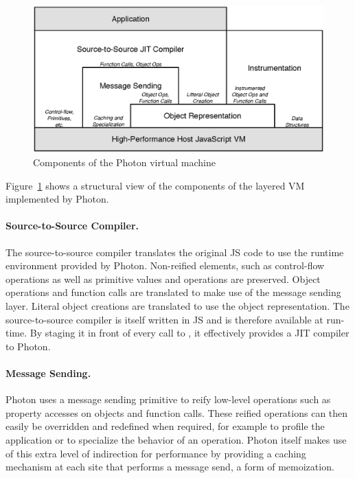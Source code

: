 \begin{figure}[tbp]
\begin{center}
\includegraphics[width=.85\textwidth]{figures/architecture_simplified}
\caption{\label{fig:Architecture} Components of the Photon virtual machine}
\end{center}
\end{figure}

Figure~\ref{fig:Architecture} shows a structural view of the components of the
layered VM implemented by Photon.

\paragraph{Source-to-Source Compiler.} The source-to-source compiler translates
the original JS code to use the runtime environment provided by
Photon.  Non-reified elements, such as control-flow operations as well as
primitive values and operations are preserved. Object operations and function
calls are translated to make use of the message sending layer. Literal object
creations are translated to use the object representation. The
source-to-source compiler is itself written in JS and is therefore available
at run-time. By staging it in front of every call to , it effectively
provides a JIT compiler to Photon.

\paragraph{Message Sending.} Photon uses a message sending primitive to reify
low-level operations such as property accesses on objects and function calls.
These reified operations can then easily be overridden and redefined when
required, for example to profile the application or to specialize the behavior
of an operation. Photon itself makes use of this extra level of indirection for
performance by providing a caching mechanism at each site that performs a
message send, a form of memoization.

